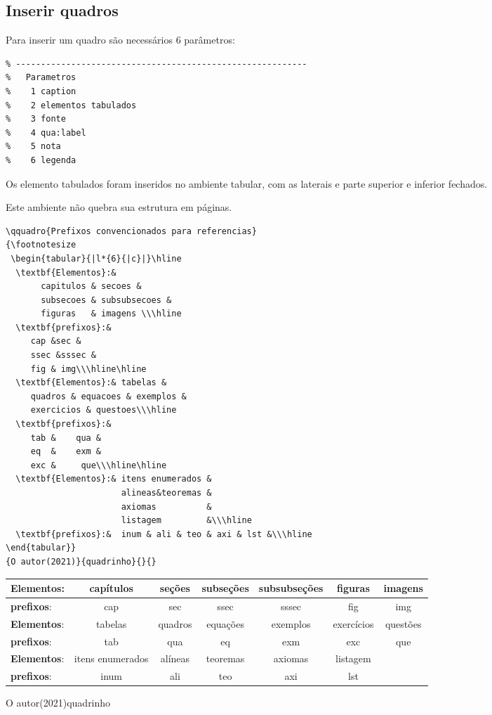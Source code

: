\subsection[Quadros]{Inserir quadros}\label{ssec:quadros}

Para inserir um quadro são necessários 6 parâmetros:

\begin{lstlisting}
% ----------------------------------------------------------
%   Parametros
%    1 caption
%    2 elementos tabulados
%    3 fonte
%    4 qua:label
%    5 nota
%    6 legenda
\end{lstlisting}

Os elemento tabulados foram inseridos no ambiente tabular, com as laterais e parte superior e inferior fechados.

Este ambiente não quebra sua estrutura em páginas.

\begin{lstlisting}
\qquadro{Prefixos convencionados para referencias}
{\footnotesize
 \begin{tabular}{|l*{6}{|c}|}\hline
  \textbf{Elementos}:& 
       capitulos & secoes & 
       subsecoes & subsubsecoes &
       figuras   & imagens \\\hline
  \textbf{prefixos}:&
     cap &sec &
     ssec &sssec &
     fig & img\\\hline\hline
  \textbf{Elementos}:& tabelas &
     quadros & equacoes & exemplos &
     exercicios & questoes\\\hline	
  \textbf{prefixos}:&
     tab &    qua & 
     eq  &    exm & 
     exc &     que\\\hline\hline
  \textbf{Elementos}:& itens enumerados &
                       alineas&teoremas &
                       axiomas          & 
                       listagem         &\\\hline
  \textbf{prefixos}:&  inum & ali & teo & axi & lst &\\\hline
\end{tabular}}
{O autor(2021)}{quadrinho}{}{}
\end{lstlisting}

{\footnotesize
 \begin{tabular}{|l*{6}{|c}|}\hline
  \textbf{Elementos}:& capítulos& 	seções&	subseções&	subsubseções&	
  figuras&	imagens \\\hline
  \textbf{prefixos}:&cap&sec&ssec&sssec&fig & img\\\hline\hline
  \textbf{Elementos}:&tabelas&	quadros&	
  equações& exemplos& exercícios & questões\\\hline	
  \textbf{prefixos}:&tab&qua&eq& exm & exc&que\\\hline\hline
  \textbf{Elementos}:&itens enumerados& alíneas&teoremas&	axiomas & listagem &\\\hline
  \textbf{prefixos}:&inum &ali&teo& axi &lst&\\\hline
\end{tabular}}
{O autor(2021)}{quadrinho}{}{}


